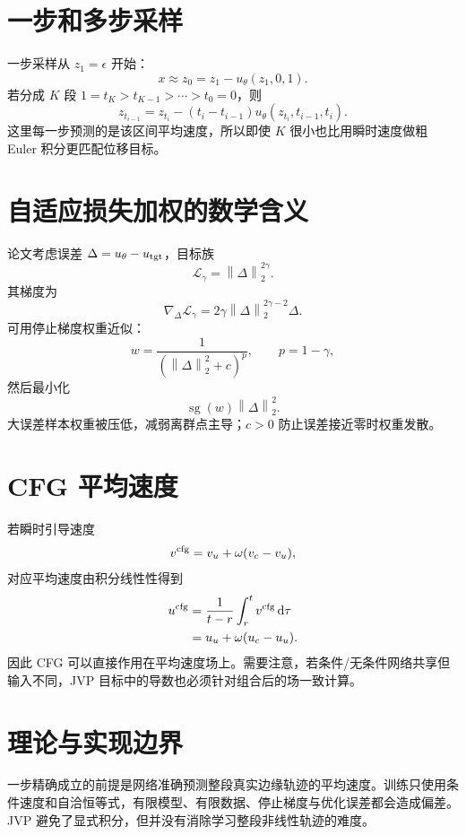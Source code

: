\documentclass[UTF8,12pt,a4paper,fontset=none]{ctexart}
\numberwithin{equation}{section}
\newcommand{\Loss}{\mathcal{L}}
\newcommand{\norm}[1]{\left\lVert #1\right\rVert}
\newcommand{\sg}{\operatorname{sg}}
\newcommand{\dd}{\mathrm{d}}
\begin{document}
\section{一步和多步采样}
一步采样从 $z_1=\epsilon$ 开始：
\begin{equation}
 \boxed{x\approx z_0=z_1-u_\theta(z_1,0,1).}
\end{equation}
若分成 $K$ 段 $1=t_K>t_{K-1}>\cdots>t_0=0$，则
\begin{equation}
 z_{t_{i-1}}=z_{t_i}-(t_i-t_{i-1})u_\theta(z_{t_i},t_{i-1},t_i).
\end{equation}
这里每一步预测的是该区间平均速度，所以即使 $K$ 很小也比用瞬时速度做粗 Euler 积分更匹配位移目标。

\section{自适应损失加权的数学含义}
论文考虑误差 $\Delta=u_\theta-u_{\rm tgt}$，目标族
\begin{equation}
 \Loss_\gamma=\norm{\Delta}_2^{2\gamma}.
\end{equation}
其梯度为
\begin{equation}
 \nabla_\Delta\Loss_\gamma
 =2\gamma\norm{\Delta}_2^{2\gamma-2}\Delta.
\end{equation}
可用停止梯度权重近似：
\begin{equation}
 w=\frac{1}{(\norm{\Delta}_2^2+c)^p},\qquad p=1-\gamma,
\end{equation}
然后最小化
\begin{equation}
 \sg(w)\norm{\Delta}_2^2.
\end{equation}
大误差样本权重被压低，减弱离群点主导；$c>0$ 防止误差接近零时权重发散。

\section{CFG 平均速度}
若瞬时引导速度
\begin{equation}
 v^{\rm cfg}=v_u+\omega(v_c-v_u),
\end{equation}
对应平均速度由积分线性性得到
\begin{align}
 u^{\rm cfg}
 &=\frac1{t-r}\int_r^t v^{\rm cfg}\,\dd\tau\\
 &=u_u+\omega(u_c-u_u).
\end{align}
因此 CFG 可以直接作用在平均速度场上。需要注意，若条件/无条件网络共享但输入不同，JVP 目标中的导数也必须针对组合后的场一致计算。

\section{理论与实现边界}
\begin{criticalbox}
一步精确成立的前提是网络准确预测整段真实边缘轨迹的平均速度。训练只使用条件速度和自洽恒等式，有限模型、有限数据、停止梯度与优化误差都会造成偏差。JVP 避免了显式积分，但并没有消除学习整段非线性轨迹的难度。
\end{criticalbox}
\end{document}
